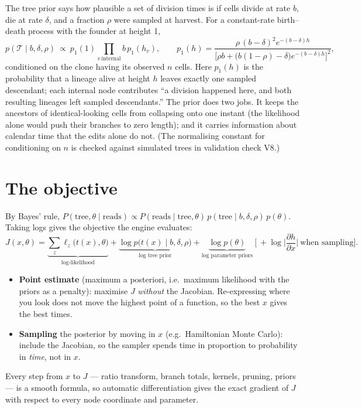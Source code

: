 \documentclass[11pt]{article}
\begin{document}
The tree prior says how plausible a set of division times is if cells divide at rate $b$, die at rate
$\delta$, and a fraction $\rho$ were sampled at harvest. For a constant-rate birth--death process with
the founder at height 1,
\begin{equation}
p(\mathcal T\mid b,\delta,\rho)\ \propto\ p_1(1)\prod_{v\ \text{internal}}b\,p_1(h_v),\qquad
p_1(h)=\frac{\rho\,(b-\delta)^2e^{-(b-\delta)h}}{\big[\rho b+\big(b(1-\rho)-\delta\big)e^{-(b-\delta)h}\big]^2},
\label{eq:prior}
\end{equation}
conditioned on the clone having its observed $n$ cells. Here $p_1(h)$ is the probability that a
lineage alive at height $h$ leaves exactly one sampled descendant; each internal node contributes ``a
division happened here, and both resulting lineages left sampled descendants.'' The prior does two
jobs. It keeps the ancestors of identical-looking cells from collapsing onto one instant (the
likelihood alone would push their branches to zero length); and it carries information about
calendar time that the edits alone do not. (The normalising constant for conditioning on $n$ is
checked against simulated trees in validation check V8.)

\section{The objective}\label{sec:objective}

By Bayes' rule,
$P(\text{tree},\theta\mid\text{reads})\propto P(\text{reads}\mid\text{tree},\theta)\,
p(\text{tree}\mid b,\delta,\rho)\,p(\theta)$. Taking logs gives the objective the engine
evaluates:
\begin{equation}
J(x,\theta)=\underbrace{\sum_{z}\ell_z\big(t(x),\theta\big)}_{\text{log-likelihood}}
+\underbrace{\log p\big(t(x)\mid b,\delta,\rho\big)}_{\text{log tree prior}}
+\underbrace{\log p(\theta)}_{\text{log parameter priors}}
\ \Big[\ +\log\Big|\frac{\partial h}{\partial x}\Big|\ \text{when sampling}\Big].
\label{eq:J}
\end{equation}
\begin{itemize}
\item \textbf{Point estimate} (maximum a posteriori, i.e.\ maximum likelihood with the priors as a
  penalty): maximise $J$ \emph{without} the Jacobian. Re-expressing where you look does not move the
  highest point of a function, so the best $x$ gives the best times.
\item \textbf{Sampling} the posterior by moving in $x$ (e.g.\ Hamiltonian Monte Carlo): include the
  Jacobian, so the sampler spends time in proportion to probability in \emph{time}, not in $x$.
\end{itemize}
Every step from $x$ to $J$ --- ratio transform, branch totals, kernels, pruning, priors --- is a
smooth formula, so automatic differentiation gives the exact gradient of $J$ with respect to every
node coordinate and parameter.
\end{document}
